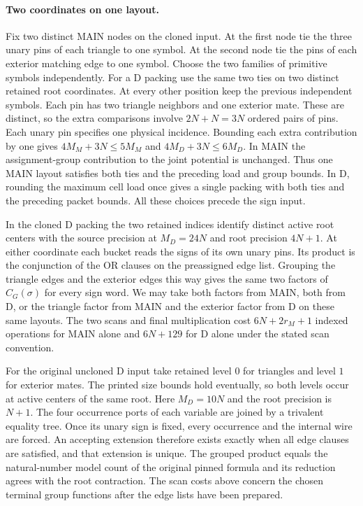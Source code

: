 \documentclass[
  11pt,
]{article}
\begin{document}
\paragraph*{Two coordinates on one layout.}
Fix two distinct MAIN nodes on the cloned input. At the first node tie
the three unary pins of each triangle to one symbol. At the second node
tie the pins of each exterior matching edge to one symbol. Choose the
two families of primitive symbols independently. For a D packing use
the same two ties on two distinct retained root coordinates. At every
other position keep the previous independent symbols. Each pin has two
triangle neighbors and one exterior mate. These are distinct, so the
extra comparisons involve \(2N+N=3N\) ordered pairs of pins. Each
unary pin specifies one physical incidence. Bounding each extra
contribution by one gives \(4M_M+3N\le5M_M\) and
\(4M_D+3N\le6M_D\). In MAIN the assignment-group contribution to the
joint potential is unchanged. Thus one MAIN layout satisfies both ties
and the preceding load and group bounds. In D, rounding the maximum
cell load once gives a single packing with both ties and the preceding
packet bounds. All these choices precede the sign input.

In the cloned D packing the two retained indices identify distinct
active root centers with the source precision at \(M_D=24N\) and root
precision \(4N+1\). At either coordinate each bucket reads the signs
of its own unary pins. Its product is the conjunction of the OR clauses
on the preassigned edge list. Grouping the triangle edges and the
exterior edges this way gives the same two factors of \(C_G(\sigma)\)
for every sign word. We may take both factors from MAIN, both from D,
or the triangle factor from MAIN and the exterior factor from D on
these same layouts. The two scans and final multiplication cost
\(6N+2r_M+1\) indexed operations for MAIN alone and \(6N+129\) for D
alone under the stated scan convention.

For the original uncloned D input take retained level \(0\) for
triangles and level \(1\) for exterior mates. The printed size bounds
hold eventually, so both levels occur at active centers of the same
root. Here \(M_D=10N\) and the root precision is \(N+1\). The
four occurrence ports of each variable are joined by a trivalent
equality tree. Once its unary sign is fixed, every occurrence and the
internal wire are forced. An accepting extension therefore exists
exactly when all edge clauses are satisfied, and that extension is
unique. The grouped product equals the natural-number model count of
the original pinned formula and its reduction agrees with the root
contraction. The scan costs above concern the chosen terminal group
functions after the edge lists have been prepared.
\end{document}
